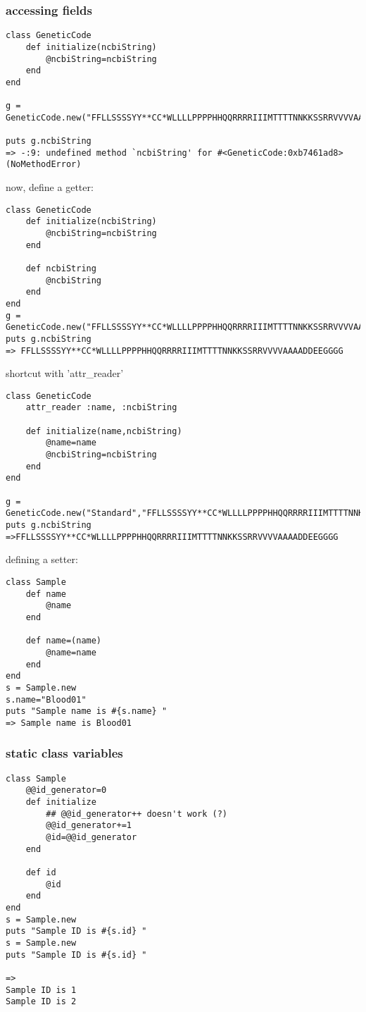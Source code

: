 \documentclass{article}
\begin{document}
\subsubsection{accessing fields}
\begin{lstlisting}
class GeneticCode
	def initialize(ncbiString)
		@ncbiString=ncbiString
	end
end

g = GeneticCode.new("FFLLSSSSYY**CC*WLLLLPPPPHHQQRRRRIIIMTTTTNNKKSSRRVVVVAAAADDEEGGGG")

puts g.ncbiString
=> -:9: undefined method `ncbiString' for #<GeneticCode:0xb7461ad8> (NoMethodError)
\end{lstlisting}
now, define a getter:

\begin{lstlisting}
class GeneticCode
	def initialize(ncbiString)
		@ncbiString=ncbiString
	end
	
	def ncbiString
		@ncbiString
	end 
end
g = GeneticCode.new("FFLLSSSSYY**CC*WLLLLPPPPHHQQRRRRIIIMTTTTNNKKSSRRVVVVAAAADDEEGGGG")
puts g.ncbiString
=> FFLLSSSSYY**CC*WLLLLPPPPHHQQRRRRIIIMTTTTNNKKSSRRVVVVAAAADDEEGGGG
\end{lstlisting}

shortcut with 'attr\_reader'
\begin{lstlisting}
class GeneticCode
	attr_reader :name, :ncbiString

	def initialize(name,ncbiString)
		@name=name
		@ncbiString=ncbiString
	end
end

g = GeneticCode.new("Standard","FFLLSSSSYY**CC*WLLLLPPPPHHQQRRRRIIIMTTTTNNKKSSRRVVVVAAAADDEEGGGG")
puts g.ncbiString
=>FFLLSSSSYY**CC*WLLLLPPPPHHQQRRRRIIIMTTTTNNKKSSRRVVVVAAAADDEEGGGG
\end{lstlisting}


defining a setter:
\begin{lstlisting}
class Sample
	def name
		@name
	end
	
	def name=(name)
		@name=name
	end
end
s = Sample.new
s.name="Blood01"
puts "Sample name is #{s.name} "
=> Sample name is Blood01
\end{lstlisting}
\subsubsection{static class variables}
\begin{lstlisting}
class Sample
	@@id_generator=0
	def initialize
		## @@id_generator++ doesn't work (?)
		@@id_generator+=1
		@id=@@id_generator
	end
	
	def id
		@id
	end
end
s = Sample.new
puts "Sample ID is #{s.id} "
s = Sample.new
puts "Sample ID is #{s.id} "

=>
Sample ID is 1 
Sample ID is 2 
\end{lstlisting}
\end{document}

